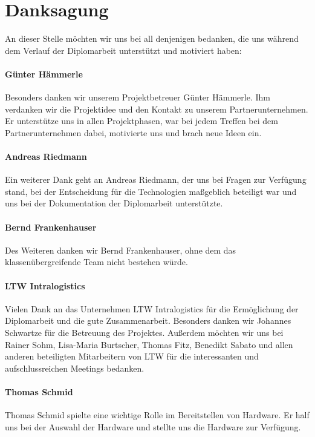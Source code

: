 \section*{Danksagung}

An dieser Stelle möchten wir uns bei all denjenigen bedanken, die uns während dem Verlauf der Diplomarbeit unterstützt und motiviert haben: \\

\paragraph*{Günter Hämmerle}
Besonders danken wir unserem Projektbetreuer Günter Hämmerle. Ihm verdanken wir die Projektidee und den Kontakt zu unserem Partnerunternehmen. Er unterstütze uns in allen Projektphasen, war bei jedem Treffen bei dem Partnerunternehmen dabei, motivierte uns und brach neue Ideen ein.

\paragraph*{Andreas Riedmann}
Ein weiterer Dank geht an Andreas Riedmann, der uns bei Fragen zur Verfügung stand, bei der Entscheidung für die Technologien maßgeblich beteiligt war und uns bei der Dokumentation der Diplomarbeit unterstützte.

\paragraph*{Bernd Frankenhauser}
Des Weiteren danken wir Bernd Frankenhauser, ohne dem das klassenübergreifende Team nicht bestehen würde.

\paragraph*{LTW Intralogistics}
Vielen Dank an das Unternehmen LTW Intralogistics für die Ermöglichung der Diplomarbeit und die gute Zusammenarbeit. Besonders danken wir Johannes Schwartze für die Betreuung des Projektes. Außerdem möchten wir uns bei Rainer Sohm, Lisa-Maria Burtscher, Thomas Fitz, Benedikt Sabato und allen anderen beteiligten Mitarbeitern von LTW für die interessanten und aufschlussreichen Meetings bedanken.

\paragraph*{Thomas Schmid}
Thomas Schmid spielte eine wichtige Rolle im Bereitstellen von Hardware. Er half uns bei der Auswahl der Hardware und stellte uns die Hardware zur Verfügung.


